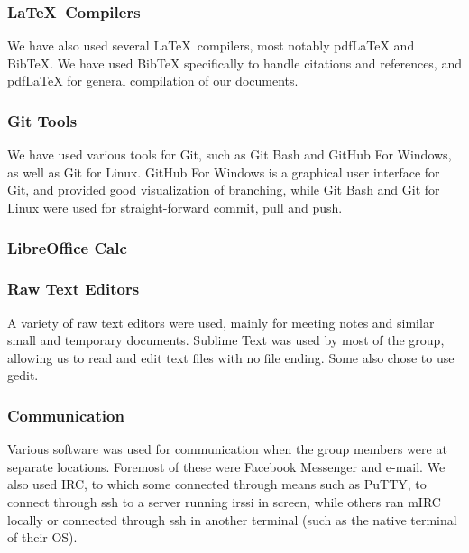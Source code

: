 \subsubsection{\LaTeX \ Compilers}
We have also used several \LaTeX \ compilers, most notably pdfLaTeX and BibTeX. We have used BibTeX specifically to handle citations and references, and pdfLaTeX for general compilation of our documents.

\subsubsection{Git Tools}
We have used various tools for Git, such as Git Bash and GitHub For Windows, as well as Git for Linux. GitHub For Windows is a graphical user interface for Git, and provided good visualization of branching, while Git Bash and Git for Linux were used for straight-forward commit, pull and push.

\subsubsection{LibreOffice Calc}

\subsubsection{Raw Text Editors}
A variety of raw text editors were used, mainly for meeting notes and similar small and temporary documents. Sublime Text was used by most of the group, allowing us to read and edit text files with no file ending. Some also chose to use gedit.

\subsubsection{Communication}
Various software was used for communication when the group members were at separate locations. Foremost of these were Facebook Messenger and e-mail. We also used IRC, to which some connected through means such as PuTTY, to connect through ssh to a server running irssi in screen, while others ran mIRC locally or connected through ssh in another terminal (such as the native terminal of their OS).
